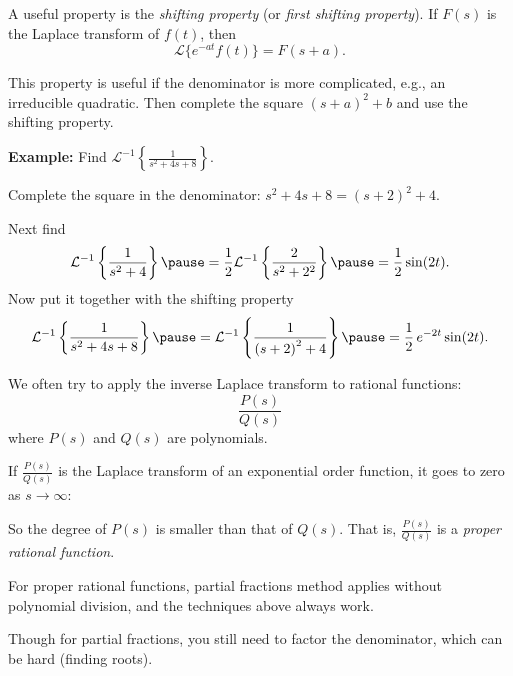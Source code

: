 \documentclass[10pt,aspectratio=169]{beamer}
\begin{document}
\begin{frame}

A useful property is the 
\emph{shifting property} (or \emph{first shifting property}).
If $F(s)$ is the Laplace transform of $f(t)$, then
\begin{equation*}
\mathcal{L} \bigl\{ e^{-at} f(t) \bigr\} = F(s+a) .
\end{equation*}

\pause
This property is useful if the denominator is more complicated, e.g.,
an irreducible quadratic.  Then complete the square
 ${(s+a)}^2+b$
and use
the shifting property.

\medskip
\pause

\textbf{Example:}
Find
$\displaystyle {\mathcal{L}}^{-1} \left\{ \frac{1}{s^2+4s+8} \right\}$.

\medskip
\pause

Complete the square in the denominator:
$s^2+4s+8 = {(s+2)}^2+4$.

\medskip
\pause

Next find
\begin{equation*}
{\mathcal{L}}^{-1} \left\{ \frac{1}{s^2+4} \right\}
\pause
=
\frac{1}{2}
{\mathcal{L}}^{-1} \left\{ \frac{2}{s^2+2^2} \right\}
\pause
=
\frac{1}{2} \sin (2t) .
\end{equation*}
\pause
Now put it together with the shifting property
\begin{equation*}
{\mathcal{L}}^{-1} \left\{ \frac{1}{s^2+4s+8} \right\}
\pause
= 
{\mathcal{L}}^{-1} \left\{ \frac{1}{{(s+2)}^2+4} \right\}
\pause
=
\frac{1}{2}\,e^{-2t} \sin (2t) .
\end{equation*}
\end{frame}

\begin{frame}
We often try to 
apply the inverse Laplace transform to
rational functions:
\begin{equation*}
\frac{P(s)}{Q(s)}
\end{equation*}
where $P(s)$ and $Q(s)$ are polynomials.

\medskip
\pause

If $\frac{P(s)}{Q(s)}$ is the Laplace transform of an exponential order function,
it goes to zero as $s \to \infty$:

\pause
So the degree of $P(s)$
is smaller than that of $Q(s)$.
That is,
$\frac{P(s)}{Q(s)}$ is a \emph{proper rational function}.

\medskip
\pause

For proper rational functions, partial fractions method applies without
polynomial division, and the techniques above always work.

\medskip
\pause

Though for partial fractions, you still need to factor the denominator,
which can be hard (finding roots).

\end{frame}
\end{document}
